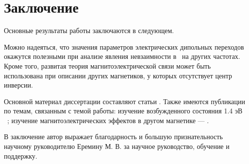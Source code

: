 \chapter*{Заключение}                       %


Основные результаты работы заключаются в следующем.

Можно надеяться, что значения параметров электрических дипольных переходов окажутся полезными при анализе явления невзаимности в \cbo\ на других частотах. Кроме того, развитая теория магнитоэлектрической связи может быть использована при описании других магнетиков, у которых отсутствует центр инверсии.

Основной материал диссертации составляют статьи \cite{Eremin2021, Nurmukhametov2022}. Также имеются публикации по темам, связанным с темой работы: изучение возбужденного состояния 1.4 эВ \cbo\ \cite{Kopteva2022}; изучение магнитоэлектрических эффектов в другом магнетике ---  \cite{Vasin2022}.

В заключение автор выражает благодарность и большую признательность научному руководителю
Еремину М. В. за научное руководство, обучение и поддержку.
